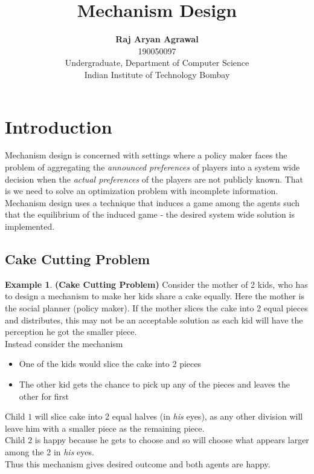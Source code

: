 \documentclass{article}
\title{Mechanism Design}
\author{
	\textbf{Raj Aryan Agrawal}\\
	190050097\\
	Undergraduate, Department of Computer Science\\
	Indian Institute of Technology Bombay
}
\theoremstyle{definition}
\newtheorem{example}{Example}[section]
\begin{document}
\maketitle
\setcounter{tocdepth}{2}
\tableofcontents

\section{Introduction}
Mechanism design is concerned with settings where a policy maker faces the problem of aggregating the \textit{announced preferences} of players into a system wide decision when the \textit{actual preferences} of the players are not publicly known. That is we need to solve an optimization problem with incomplete information.\\
Mechanism design uses a technique that induces a game among the agents such that the equilibrium of the induced game - the desired system wide solution is implemented.
\subsection{Cake Cutting Problem}
\begin{example}
\textbf{(Cake Cutting Problem)} Consider the mother of 2 kids, who has to design a mechanism to make her kids share a cake equally. Here the mother is the social planner (policy maker). If the mother slices the cake into 2 equal pieces and distributes, this may not be an acceptable solution as each kid will have the perception he got the smaller piece.\\
Instead consider the mechanism
\begin{itemize}
	\item One of the kids would slice the cake into 2 pieces
	\item The other kid gets the chance to pick up any of the pieces and leaves the other for first
\end{itemize}
Child $1$ will slice cake into 2 equal halves (in \textit{his} eyes), as any other division will leave him with a smaller piece as the remaining piece.\\
Child $2$ is happy because he gets to choose and so will choose what appears larger among the 2 in \textit{his} eyes.\\
Thus this mechanism gives desired outcome and both agents are happy.
\end{example}
\end{document}
